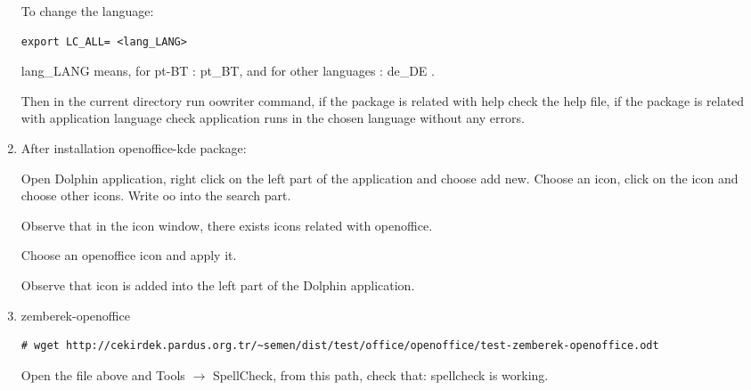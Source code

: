 \documentclass[a4paper,10pt]{article}
\begin{document}
\begin{enumerate}
\begin{verbatim}
\end{verbatim}

To change the language:
\begin{verbatim}
export LC_ALL= <lang_LANG>
\end{verbatim}

lang\_LANG means, for pt-BT : pt\_BT, and for other languages : de\_DE .

Then in the current directory run oowriter command, if the package is related with help check the help file, if the package is related with application language check application runs in the chosen language without any errors.


\item After installation openoffice-kde package:

Open Dolphin application, right click on the left part of the application and choose add new. Choose an icon, click on the icon and choose other icons. Write oo into the search part.

Observe that in the icon window, there exists icons related with openoffice.

Choose an openoffice icon and apply it.

Observe that icon is added into the left part of the Dolphin application.

\item zemberek-openoffice

\begin{verbatim}
# wget http://cekirdek.pardus.org.tr/~semen/dist/test/office/openoffice/test-zemberek-openoffice.odt
\end{verbatim}

Open the file above and Tools $\rightarrow$ SpellCheck, from this path, check that: spellcheck is working.
\end{enumerate}
\end{document}
